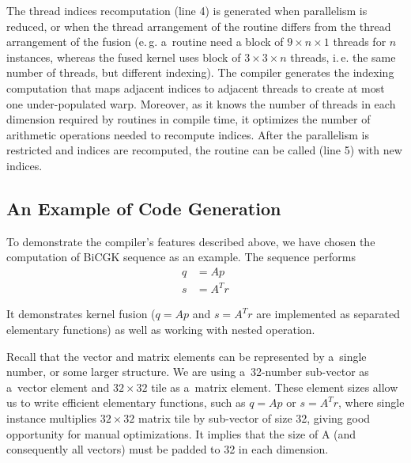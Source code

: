 \documentclass[final]{siamltex}
\def\eg{e.\,g.}
\def\ie{i.\,e.}
\begin{document}
{The thread indices recomputation (line 4) is generated when parallelism is reduced, or when the thread arrangement of the routine differs from the thread arrangement of the fusion (\eg{} a~routine need a block of $9 \times n \times 1$ threads for $n$ instances, whereas the fused kernel uses block of $3 \times 3 \times n$ threads, \ie{} the same number of threads, but different indexing). The compiler generates the indexing computation that maps adjacent indices to adjacent threads to create at most one under-populated warp. Moreover, as it knows the number of threads in each dimension required by routines in compile time, it optimizes the number of arithmetic operations needed to recompute indices. After the parallelism is restricted and indices are recomputed, the routine can be called (line 5) with new indices.





























\subsection{An Example of Code Generation}

To demonstrate the compiler's features described above, we have chosen the computation of BiCGK sequence as an example. The sequence performs
\begin{align*} 
q &= Ap \\
s &= A^Tr 
\end{align*}


It demonstrates kernel fusion ($q = Ap$ and $s = A^Tr$ are implemented as separated elementary functions) as well as working with nested operation.

Recall that the vector and matrix elements can be represented by a~single number, or some larger structure. We are using a~32-number sub-vector as a~vector element and $32\times32$ tile as a~matrix element. These element sizes allow us to write efficient elementary functions, such as $q = Ap$ or $s = A^Tr$, where single instance multiplies $32\times32$ matrix tile by sub-vector of size 32, giving good opportunity for manual optimizations. It implies that the size of A (and consequently all vectors) must be padded to 32 in each dimension.

}
\end{document}
